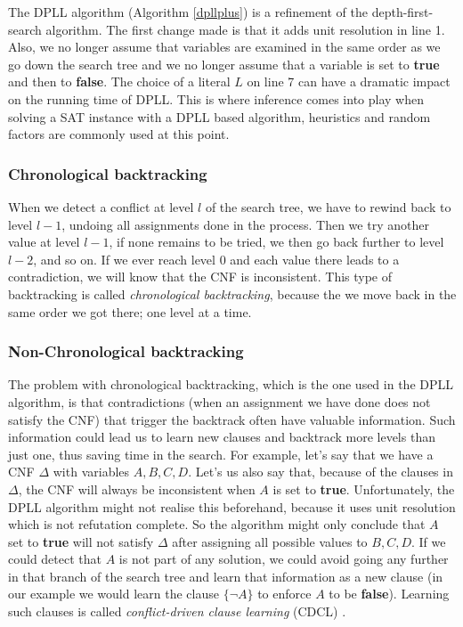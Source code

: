 \documentclass[12pt]{diicc}
\begin{document}
The DPLL algorithm (Algorithm \ref{dpllplus}) is a refinement of the depth-first-search algorithm. The first change made is that it adds unit resolution in line 1. Also, we no longer assume that variables are examined in the same order as we go down the search tree and we no longer assume that a variable is set to \textbf{true} and then to \textbf{false}. The choice of a literal $L$ on line 7 can have a dramatic impact on the running time of DPLL. This is where inference comes into play when solving a SAT instance with a DPLL based algorithm, heuristics and random factors are commonly used at this point. 

\subsubsection{Chronological backtracking}

When we detect a conflict at level $l$ of the search tree, we have to rewind back to level $l-1$, undoing all assignments done in the process. Then we try another value at level $l-1$, if none remains  to be tried, we then go back further to level $l-2$, and so on. If we ever reach level $0$ and each value there leads to a contradiction, we will know that the CNF is inconsistent. This type of backtracking is called \textit{chronological backtracking}, because the we move back in the same order we got there; one level at a time. 

\subsubsection{Non-Chronological backtracking}

The problem with chronological backtracking, which is the one used in the DPLL algorithm, is that contradictions (when an assignment we have done does not satisfy the CNF) that trigger the backtrack often have valuable information. Such information could lead us to learn new clauses and backtrack more levels than just one, thus saving time in the search. For example, let's say that we have a CNF $\Delta$ with variables $A,B,C,D$. Let's us also say that, because of the clauses in $\Delta$, the CNF will always be inconsistent when $A$ is set to \textbf{true}. Unfortunately, the DPLL algorithm might not realise this beforehand, because it uses unit resolution which is not refutation complete. So the algorithm might only conclude that $A$ set to \textbf{true} will not satisfy $\Delta$ after assigning all possible values to $B,C,D$. If we could detect that $A$ is not part of any solution, we could avoid going any further in that branch of the search tree and learn that information as a new clause (in our example we would learn the clause $\{\neg A\}$ to enforce $A$ to be \textbf{false}). Learning such clauses is called \textit{conflict-driven clause learning} (CDCL) \cite{cdcl1,cdcl2}.
\end{document}
